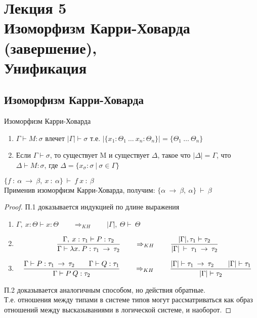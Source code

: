 \section{Лекция 5 \\ Изоморфизм Карри-Ховарда (завершение), \\Унификация}
		\subsection{Изоморфизм Карри-Ховарда}
	\begin{theorem}Изоморфизм Карри-Ховарда\end{theorem}

	\begin{enumerate}
		\item $\Gamma\vdash M:\sigma$ влечет $|\Gamma|\vdash \sigma$ т.е. $|\{x_1:\Theta_1\:\hdots \:x_n:\Theta_n\}|=\{\Theta_1\:\hdots\:\Theta_n\}$
		\item Если $\Gamma\vdash\sigma$, то существует M и существует $\Delta$, такое что $|\Delta|=\Gamma$, что $\Delta \vdash M: \sigma$, где $\Delta=\{x_{\sigma} : \sigma\:|\:\sigma\in\Gamma  \}$
	\end{enumerate}
	\begin{example}
	$\{f\: :\:\alpha\:\rightarrow\:\beta,\:x\: :\:\alpha\}\:\vdash\:f\:x\::\:\beta$ \\Применив изоморфизм Карри-Ховарда, получим: $\{\alpha\:\rightarrow\:\beta,\:\alpha\}\:\vdash\:\beta$
	\end{example}
	\begin{proof}
		\par П.1 доказывается индукцией по длине выражения
			\begin{enumerate}
				\item $\Gamma,\:x:\Theta\vdash x:\Theta \qquad \Rightarrow_{KH} \qquad |\Gamma|,\:\Theta\vdash\:\Theta$
				\item $${\Gamma,\:x:\tau_1\vdash P:\tau_2 \over \Gamma \vdash \lambda x.\:P:\tau_1\:\rightarrow\:\tau_2} \qquad \Rightarrow_{KH} \qquad {|\Gamma|, \tau_1\vdash\tau_2\over |\Gamma|\:\vdash\:\tau_1\:\rightarrow\:\tau_2}$$
				\item $${\Gamma\vdash P:\tau_1\:\rightarrow\:\tau_2 \hspace{2em} \Gamma\vdash Q:\tau_1 \over \Gamma \vdash P\:Q:\tau_2} \qquad \Rightarrow_{KH} \qquad {|\Gamma|\vdash \tau_1\:\rightarrow\:\tau_2 \hspace{2em} |\Gamma|\vdash \tau_1 \over |\Gamma| \vdash \tau_2}$$
			\end{enumerate}
\par П.2 доказывается аналогичным способом, но действия обратные.\\
Т.е. отношения между типами в системе типов могут рассматриваться как образ отношений между высказываниями в логической системе, и наоборот.
\end{proof}

